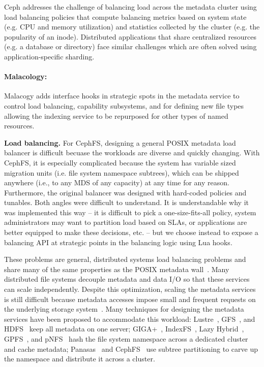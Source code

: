 \documentclass[10pt,twocolumn]{article}
\begin{document}
Ceph addresses the challenge of balancing load across the metadata cluster
using load balancing policies that compute balancing metrics based on system
state (e.g. CPU and memory utilization) and statistics collected by the
cluster (e.g. the popularity of an inode). Distributed applications that share
centralized resources (e.g. a database or directory) face similar challenges
which are often solved using application-specific sharding. 

\paragraph*{Malacology:}
Malacogy adds interface hooks in strategic spots in the metadata service to
control load balancing, capability subsystems, and for defining new file
types allowing the indexing service to be repurposed for other types of
named resources.

{\bf Load balancing.}
For CephFS, designing a general POSIX metadata load balancer is difficult
becuase the workloads are diverse and quickly changing. With CephFS, it is
especially complicated because the system has variable sized migration units
(i.e. file system namespace subtrees), which can be shipped anywhere (i.e., to
any MDS of any capacity) at any time for any reason. Furthermore, the original
balancer was designed with hard-coded policies and tunables. Both angles were
difficult to understand. It is understandable why it was implemented this way
-- it is difficult to pick a one-size-fits-all policy, system administrators
may want to partition load based on SLAs, or applications are better equipped
to make these decisions, etc. -- but we choose instead to expose a balancing
API at strategic points in the balancing logic using Lua hooks. 

These problems are general, distributed systems load balancing problems and
share many of the same properties as the POSIX metadata
wall~\cite{alam:pdsw2011-metadata-scaling,ghemawat:sosp2003-gfs,hildebrand:msst2005-pnfs,weil_ceph_2006,welch:fast2008-panasas,shvachko:login2012-hdfs-scalability}.
Many distributed file systems decouple metadata and data I/O so that these
services can scale independently. Despite this optimization, scaling the
metadata services is still difficult because metadata accesses impose small
and frequent requests on the underlying storage
system~\cite{roselli:atec2000-FS-workloads}. Many techniques for designing the
metadata services have been proposed to accommodate this workload:
Lustre~\cite{konstantinos:pdsw2014-lustre-metadata},
GFS~\cite{ghemawat:sosp2003-gfs}, and
HDFS~\cite{shvachko:login2012-hdfs-scalability} keep all metadata on one
server; GIGA+~\cite{patil:fast2011-giga}, IndexFS~\cite{ren:sc2014-indexfs},
Lazy Hybrid~\cite{brandt:msst2003-lh}, GPFS~\cite{schmuck:fast2002-gpfs}, and
pNFS~\cite{hildebrand:supercomputing2006-pNFS} hash the file system namespace
across a dedicated cluster and cache metadata;
Panasas~\cite{welch:fast2008-panasas} and
CephFS~\cite{weil:sc2004-dyn-metadata} use subtree partitioning to carve up
the namespace and distribute it across a cluster.
\end{document}
